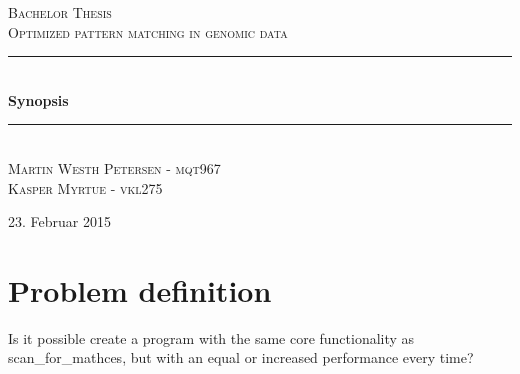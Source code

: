 \documentclass[12pt]{article}
\newcommand{\HRule}{\rule{\linewidth}{0.5mm}}
\begin{document}
\begin{titlepage}
\begin{center}

\textsc{\Large Bachelor Thesis \\ Optimized pattern matching in genomic data\\[0.3cm]}
\HRule \\[0.4cm]
{ \LARGE \bfseries Synopsis}\\[0.4cm]
\HRule \\[1.2cm]
\textsc{\large Martin Westh Petersen - mqt967 \\ Kasper Myrtue - vkl275}\\[1.0cm]
\end{center}
\begin{center}
\vfill
{\large 23. Februar 2015}
\end{center}
\end{titlepage}
\section{Problem definition}
Is it possible create a program with the same core functionality as scan\_for\_mathces, but with an equal or
increased performance every time?
\end{document}
